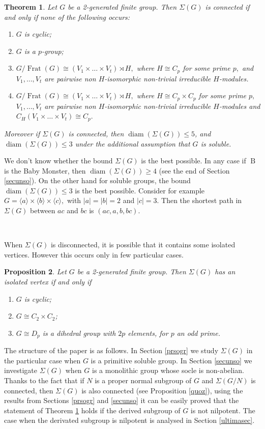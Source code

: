 \documentclass{amsart}
\DeclareMathOperator{\frat}{Frat}
\DeclareMathOperator{\diam}{diam}
\DeclareMathOperator{\B}{B}
\newcommand{\ifa}{if and only if }
\newtheorem{thm}{Theorem}
\newtheorem{prop}[thm]{Proposition} \newtheorem{rem}[thm]{Remark}
\numberwithin{equation}{section}
\begin{document}
	
\begin{thm}\label{main}
Let $G$ be a 2-generated finite group. Then $\Sigma(G)$ is connected if and only if none  of the following occurs:
\begin{enumerate}
	\item $G$ is cyclic;
	\item $G$ is a $p$-group;
	\item  $G/\frat(G)\cong (V_1\times \dots \times V_t)\rtimes H,$
	where $H\cong C_p$ for some prime $p,$ and $V_1,\dots,V_t$
	are pairwise non $H$-isomorphic non-trivial irreducible $H$-modules.
		\item  $G/\frat(G)\cong (V_1\times \dots \times V_t)\rtimes H,$
		where $H\cong C_p\times C_p$ for some prime $p,$  $V_1,\dots,V_t$
		are pairwise non $H$-isomorphic
		non-trivial irreducible $H$-modules and $C_H(V_1\times \dots \times V_t)\cong C_p.$
	\end{enumerate}
	Moreover if $\Sigma(G)$ is connected, then $\diam(\Sigma(G))\leq 5$, and
	$\diam(\Sigma(G))\leq 3$ under the additional assumption that $G$ is soluble.
\end{thm}
We don't know whether the bound $\Sigma(G)$ is the best possible. In any case if $\B$ is the Baby Monster, then $\diam(\Sigma(G))\geq 4$ (see the end of Section 	\ref{secunso}). On the other hand for soluble groups, the bound $\diam(\Sigma(G))\leq 3$ is the best possible. Consider for example $G=\langle a \rangle \times \langle b \rangle \times
\langle c \rangle,$ with $|a|=|b|=2$ and $|c|=3.$ Then the shortest path in $\Sigma(G)$ between $ac$ and $bc$ is
$(ac,a,b,bc).$

\

When $\Sigma(G)$ is disconnected, it is possible that it contains some isolated vertices. However this occurs only in few particular cases.
\begin{prop}\label{isola}Let $G$ be a 2-generated finite group. Then
	$\Sigma(G)$ has an isolated vertex \ifa 
	\begin{enumerate}
		\item $G$ is cyclic;
		\item $G\cong C_2\times C_2$;
		\item $G\cong D_p$ is a dihedral group with $2p$ elements, for $p$ an odd prime.
	\end{enumerate}
\end{prop}

The structure of the paper is as follows. In Section \ref{prsogr}
we study $\Sigma(G)$ in the particular case when $G$ is a primitive soluble group. In Section \ref{secunso} we investigate $\Sigma(G)$ when $G$ is a monolithic group whose socle is non-abelian. Thanks to the fact that if $N$ is a proper normal subgroup of $G$ and $\Sigma(G/N)$ is connected, then $\Sigma(G)$ is also connected
(see Proposition \ref{quoz}), using the results from Sections \ref{prsogr} and \ref{secunso} it can be easily proved that
the statement of Theorem \ref{main} holds if the derived subgroup of $G$ is not nilpotent. The case when the derivated subgroup is nilpotent is analysed in Section \ref{ultimasec}.
\end{document}
